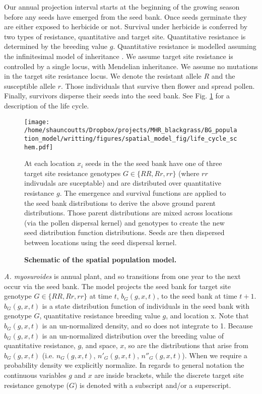 \documentclass[10pt,letterpaper]{article}
\begin{document}
Our annual projection interval starts at the beginning of the growing season before any seeds have emerged from the seed bank. Once seeds germinate they are either exposed to herbicide or not. Survival under herbicide is conferred by two types of resistance, quantitative and target site. Quantitative resistance is determined by the breeding value $g$. Quantitative resistance is modelled assuming the infinitesimal model of inheritance \cite{Fish1918}. We assume target site resistance is controlled by a single locus, with Mendelian inheritance. We assume no mutations in the target site resistance locus. We denote the resistant allele $R$ and the susceptible allele $r$. Those individuals that survive then flower and spread pollen. Finally, survivors disperse their seeds into the seed bank. See Fig. \ref{fig:schematic} for a description of the life cycle.  

\begin{figure}[!h]
	\centering
	\texttt{[image: /home/shauncoutts/Dropbox/projects/MHR\_blackgrass/BG\_population\_model/writting/figures/spatial\_model\_fig/life\_cycle\_schem.pdf]}
\caption{\bf Schematic of the spatial population model.} At each location $x_i$ seeds in the the seed bank have one of three target site resistance genotypes $G \in \{RR, Rr, rr\}$ (where $rr$ indivudals are suceptable) and are distributed over quantitative resistance $g$. The emergence and survival functions are applied to the seed bank distributions to derive the above ground parent distributions. Those parent distributions are mixed across locations (via the pollen dispersal kernel) and genotypes to create the new seed distribution function distributions. Seeds are then dispersed between locations using the seed dispersal kernel. \label{fig:schematic}
\end{figure}

\textit{A. myosuroides} is annual plant, and so transitions from one year to the next occur via the seed bank. The model projects the seed bank for target site genotype $G \in \{RR, Rr, rr\}$ at time $t$, $b_G(g, x, t)$, to the seed bank at time $t+1$. $b_G(g, x, t)$ is a state distribution function of individuals in the seed bank with genotype $G$, quantitative resistance breeding value $g$, and location x. Note that $b_G(g, x, t)$ is an un-normalized density, and so does not integrate to 1. Because $b_G(g, x, t)$ is an un-normalized distribution over the breeding value of quantitative resistance, $g$, and space, $x$, so are the distributions that arise from $b_G(g, x, t)$ (i.e. $n_G(g, x, t)$, $n'_G(g, x, t)$, $n''_G(g, x, t)$). When we require a probability density we explicitly normalize. In regards to general notation the continuous variables $g$ and $x$ are inside brackets, while the discrete target site resistance genotype ($G$) is denoted with a subscript and/or a superscript.    
\end{document}
